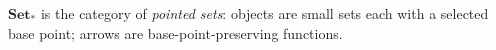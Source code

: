 $\mathbf{Set}_*$ is the category of \emph{pointed sets}: objects are small sets each with a selected base point; arrows are base-point-preserving functions.
